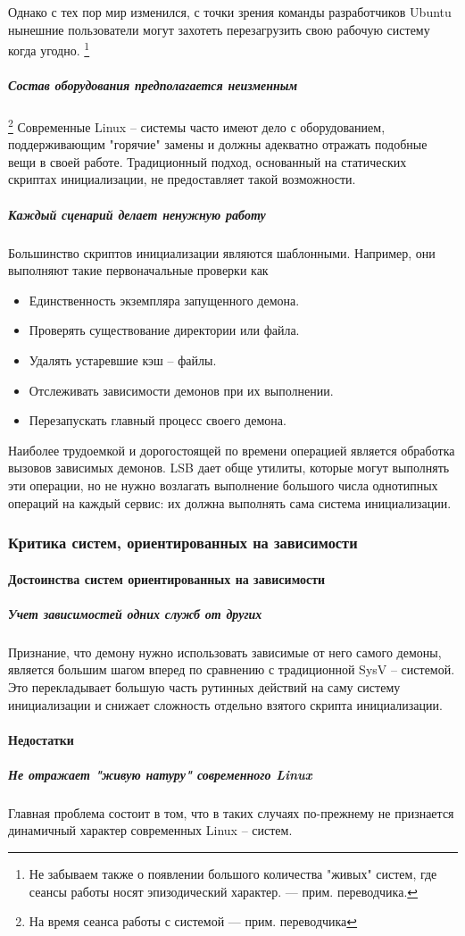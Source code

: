 Однако с тех пор мир изменился, с точки зрения команды разработчиков Ubuntu нынешние пользователи могут захотеть перезагрузить свою рабочую систему когда угодно. \footnote{Не забываем также о появлении большого количества "живых" систем, где сеансы работы носят эпизодический характер. --- прим. переводчика.}
\subparagraph{Состав оборудования предполагается неизменным}\footnote{На время сеанса работы с системой --- прим. переводчика}
Современные Linux -- системы часто имеют дело с оборудованием, поддерживающим "горячие" замены и должны адекватно отражать подобные вещи в своей работе. Традиционный подход, основанный на статических скриптах инициализации, не предоставляет такой возможности.
\subparagraph{Каждый сценарий делает ненужную работу} 
Большинство скриптов инициализации являются шаблонными. Например, они выполняют такие первоначальные проверки как \begin{itemize}
\item Единственность экземпляра запущенного демона.
\item Проверять существование директории или файла.
\item Удалять устаревшие кэш -- файлы.
\item Отслеживать зависимости демонов при их выполнении.
\item Перезапускать главный процесс своего демона.
\end{itemize}
Наиболее трудоемкой и дорогостоящей по времени операцией является обработка вызовов зависимых демонов. LSB дает обще утилиты, которые могут выполнять эти операции, но не нужно возлагать выполнение большого числа однотипных операций на каждый сервис: их должна выполнять сама система инициализации.
\subsubsection{Критика систем, ориентированных на зависимости}
\paragraph{Достоинства систем ориентированных на зависимости}
\subparagraph{Учет зависимостей одних служб от других}
Признание, что демону нужно использовать зависимые от него самого демоны, является большим шагом вперед по сравнению с традиционной SysV -- системой. Это перекладывает большую часть рутинных действий на саму систему инициализации и снижает сложность отдельно взятого скрипта инициализации.
\paragraph{Недостатки}
\subparagraph{Не отражает "живую натуру" современного Linux}
Главная проблема состоит в том, что в таких случаях по-прежнему не признается динамичный характер современных Linux -- систем.

